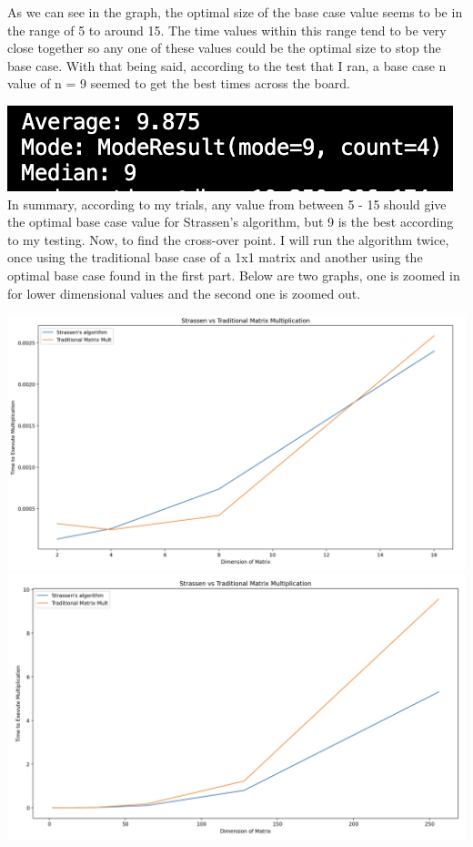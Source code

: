 \documentclass{article}
\begin{document}
As we can see in the graph, the optimal size of the base case value seems to be in the range of 5 to around 15. The time values within this range tend to be very close together so any one of these values could be the optimal size to stop the base case. With that being said, according to the test that I ran, a base case n value of n = 9 seemed to get the best times across the board.

\includegraphics[width=\textwidth]{best_n.png} \\

In summary, according to my trials, any value from between 5 - 15 should give the optimal base case value for Strassen's algorithm, but 9 is the best according to my testing. Now, to find the cross-over point. I will run the algorithm twice, once using the traditional base case of a 1x1 matrix and another using the optimal base case found in the first part. Below are two graphs, one is zoomed in for lower dimensional values and the second one is zoomed out.

\includegraphics[width=\textwidth]{graph2.png}
\includegraphics[width=\textwidth]{graph3.png} \\
\end{document}
